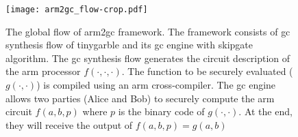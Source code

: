 \begin{figure}
\centering
\texttt{[image: arm2gc\_flow-crop.pdf]}
\caption{The global flow of \gls{arm2gc} framework.
The framework consists of \acrshort{gc} synthesis flow of \gls{tinygarble} and its \acrshort{gc} engine with \gls{skipgate} algorithm.
The \acrshort{gc} synthesis flow generates the circuit description of the \gls{arm} processor $f(\cdot,\cdot,\cdot)$.
The function to be securely evaluated ($g(\cdot,\cdot)$) is compiled using an \gls{arm} cross-compiler.
The \acrshort{gc} engine allows two parties (Alice and Bob) to securely compute the \gls{arm} circuit $f(a,b,p)$ where $p$ is the binary code of $g(\cdot,\cdot)$.
At the end, they will receive the output of $f(a,b,p) = g(a,b)$
}
\label{fig:arm2gc-globalflow}
\end{figure}


